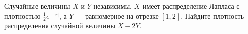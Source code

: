\documentclass{article}
\begin{document}
Случайные величины $X$ и $Y$ независимы. $X$ имеет распределение Лапласа с плотностью $\frac{1}{2} e^{-|x|}$, а $Y$ --- равномерное на отрезке $[1,2]$. Найдите плотность распределения случайной величины $X-2Y$.
\end{document}

